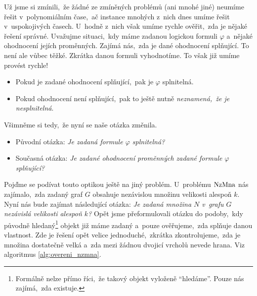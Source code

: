 Už jsme si zmínili,~že žádné ze zmíněných problémů (ani mnohé jiné) neumíme řešit v~polynomiálním čase,~ač instance mnohých z~nich dnes umíme řešit v~uspokojivých časech. U~hodně z~nich však umíme rychle ověřit,~zda je nějaké řešení správné. Uvažujme situaci,~kdy máme zadanou logickou formuli $\varphi$ a~nějaké ohodnocení jejích proměnných. Zajímá nás,~zda je dané ohodnocení splňující. To není ale vůbec těžké. Zkrátka danou formuli vyhodnotíme. To však již umíme provést rychle!
\begin{itemize}
    \item Pokud je zadané ohodnocení splňující,~pak je $\varphi$ splnitelná.
    \item Pokud ohodnocení není splňující,~pak to ještě nutně \emph{neznamená,~že je nesplnitelná}.
\end{itemize}
Všimněme si tedy,~že nyní se naše otázka změnila.
\begin{itemize}
    \item Původní otázka: \textit{Je zadaná formule $\varphi$ splnitelná?}
    \item Současná otázka: \textit{Je zadané ohodnocení proměnných zadané formule $\varphi$ splňující?}
\end{itemize}
Pojďme se podívat touto optikou ještě na jiný problém. U~problému \ensuremath{\NZMNA} nás zajímalo,~zda zadaný graf $G$ obsahuje nezávislou množinu velikosti alespoň $k$. Nyní nás bude zajímat následující otázka: \textit{Je zadaná množina $N$ v~grafu $G$ nezávislá velikosti alespoň $k$?} Opět jsme přeformulovali otázku do podoby,~kdy původně hledaný\footnote{Formálně nelze přímo říci,~že takový objekt vyloženě ``hledáme''. Pouze nás zajímá,~zda existuje.} objekt již máme zadaný a~pouze ověřujeme,~zda splňuje danou vlastnost. Zde je řešení opět velice jednoduché,~zkrátka zkontrolujeme,~zda je množina dostatečně velká a~zda mezi žádnou dvojicí vrcholů nevede hrana. Viz algoritmus \ref{alg:overeni_nzmna}.

\begin{algorithm}
    \caption{Ověření nezávislé množiny}
    \label{alg:overeni_nzmna}


\end{algorithm}

